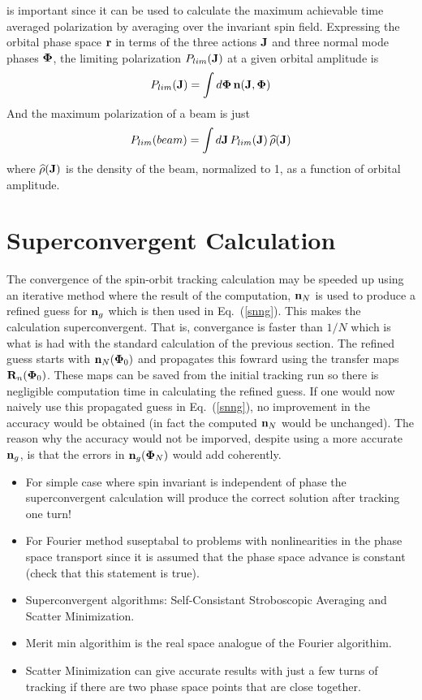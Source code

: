 \documentclass{hitec}
\newcommand{\Bf}[1]{{\bf #1}}
\newcommand{\bfn}{{\Bf n}}
\newcommand{\bfr}{{\Bf r}}
\newcommand{\bfJ}{{\Bf J}}
\newcommand{\bfR}{{\Bf R}}
\newcommand{\bfPhi}{{\Bf \Phi}}
\newcommand{\Plim}{P_{lim}}
\newcommand{\Begineq}{\begin{equation}}
\newcommand{\Endeq}{\end{equation}}
\newcommand{\Eq}[1]{{Eq.~(\protect\ref{#1})}}
\begin{document}
is important since it can be used to
calculate the maximum achievable time averaged polarization by averaging over the invariant spin
field. Expressing the orbital phase space $\bfr$ in terms of the three actions $\bfJ$ and three normal
mode phases $\bfPhi$, the limiting polarization $\Plim(\bfJ)$ at a given orbital amplitude is
\Begineq
  \Plim(\bfJ) = \int d\bfPhi \, \bfn(\bfJ, \bfPhi)
\Endeq
And the maximum polarization of a beam is just
\Begineq
   \Plim(beam) = \int d\bfJ \, \Plim(\bfJ) \, \widehat\rho(\bfJ) 
\Endeq
where $\widehat\rho(\bfJ)$ is the density of the beam, normalized to 1, as a function of orbital
amplitude.

\section{Superconvergent Calculation}

The convergence of the spin-orbit tracking calculation may be speeded up using an iterative method
where the result of the computation, $\bfn_N$ is used to produce a refined guess for $\bfn_g$ which
is then used in \Eq{snng}. This makes the calculation superconvergent. That is, convergance is
faster than $1/N$ which is what is had with the standard calculation of the previous section. The
refined guess starts with $\bfn_N(\bfPhi_0)$ and propagates this fowrard using the transfer maps
$\bfR_n(\bfPhi_0)$. These maps can be saved from the initial tracking run so there is negligible
computation time in calculating the refined guess. If one would now naively use this propagated
guess in \Eq{snng}, no improvement in the accuracy would be obtained (in fact the computed $\bfn_N$
would be unchanged). The reason why the accuracy would not be imporved, despite using a more
accurate $\bfn_g$, is that the errors in $\bfn_g(\bfPhi_N)$ would add coherently. 



\begin{itemize}
%
\item For simple case where spin invariant is independent of phase the superconvergent calculation will produce the
correct solution after tracking one turn!
%
\item For Fourier method suseptabal to problems with nonlinearities in the phase space transport since it is assumed
that the phase space advance is constant (check that this statement is true).
%
\item Superconvergent algorithms: Self-Consistant Stroboscopic Averaging and Scatter Minimization.
%
\item Merit min algorithim is the real space analogue of the Fourier algorithim.
%
\item Scatter Minimization can give accurate results with just a few turns of tracking if there are two phase
space points that are close together.
%
\end{itemize}
\end{document}
